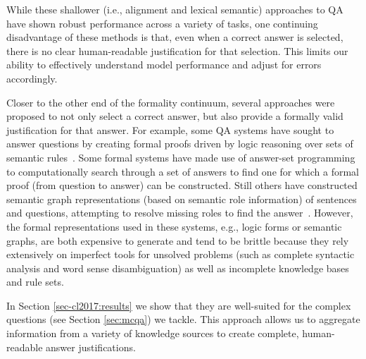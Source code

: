 While these shallower (i.e., alignment and lexical semantic) approaches to QA have shown robust performance across a variety of tasks, one continuing disadvantage of these methods is that, even when a correct answer is selected, there is no clear human-readable justification for that selection.  This limits our ability to effectively understand model performance and adjust for errors accordingly.

Closer to the other end of the formality continuum, several approaches were proposed to not only select a correct answer, but also provide a formally valid justification for that answer.  For example, some QA systems have sought to answer questions by creating formal proofs driven by logic reasoning over sets of semantic rules~\citep[e.g.,][]{moldovan2003cogex,moldovan2007cogex,
balduccini2008knowledge,
maccartney2009natural,liang2013learning,
lewis2013combining}.
Some formal systems have made use of answer-set programming \citep{baral2006using,baral2011towards,baral2012answering,
baral2012knowledge} to computationally search through a set of answers to find one for which a formal proof (from question to answer) can be constructed. 
Still others have constructed semantic graph representations (based on semantic role information) of sentences and questions, attempting to resolve missing roles to find the answer~\citep[e.g.,][]{banarescu2012amr,sharmatowards}. 
However, the formal representations used in these systems, e.g., logic forms or semantic graphs, are both expensive to generate and tend to be brittle because they rely extensively on imperfect tools for unsolved problems (such as complete syntactic analysis and word sense disambiguation) as well as incomplete knowledge bases and rule sets.  %

In Section \ref{sec-cl2017:results} we show that they are well-suited for the complex questions (see Section \ref{sec:mcqa}) we tackle.
This approach allows us to aggregate information from a variety of knowledge sources to create complete, human-readable answer justifications.  

